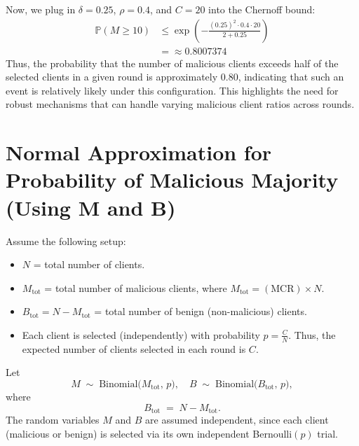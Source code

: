 Now, we plug in \( \delta = 0.25 \), \( \rho = 0.4 \), and \( C = 20 \) into the Chernoff bound:
\begin{align}
    \mathbb{P}(M \geq 10) & \leq \exp\left(-\frac{(0.25)^2 \cdot 0.4 \cdot 20}{2 + 0.25}\right) \\
    & = \approx 0.8007374
\end{align}
Thus, the probability that the number of malicious clients exceeds half of the selected clients in a given round is approximately 0.80, indicating that such an event is relatively likely under this configuration. This highlights the need for robust mechanisms that can handle varying malicious client ratios across rounds.

\section{Normal Approximation for Probability of Malicious Majority (Using M and B)}
\label{appendix:normal-approx-MB}

Assume the following setup:
\begin{itemize}
  \item $N$ = total number of clients.
  \item $M_{\text{tot}}$ = total number of malicious clients, where
        $
            M_{\text{tot}} 
            = (\text{MCR}) \times N.
        $
  \item $B_{\text{tot}} = N - M_{\text{tot}}$ = total number of benign (non-malicious) clients.
  \item Each client is selected (independently) with probability 
        $
          p = \frac{C}{N}.
        $
        Thus, the expected number of clients selected in each round is $C$.
\end{itemize}

Let
\[
    M \;\sim\; \mathrm{Binomial}\bigl(M_{\text{tot}},\, p\bigr),
    \quad
    B \;\sim\; \mathrm{Binomial}\bigl(B_{\text{tot}},\, p\bigr),
\]
where 
\[
   B_{\text{tot}} \;=\; N - M_{\text{tot}}.
\]
The random variables $M$ and $B$ are assumed independent, since each client (malicious or benign) is selected via its own independent Bernoulli$(p)$ trial.

